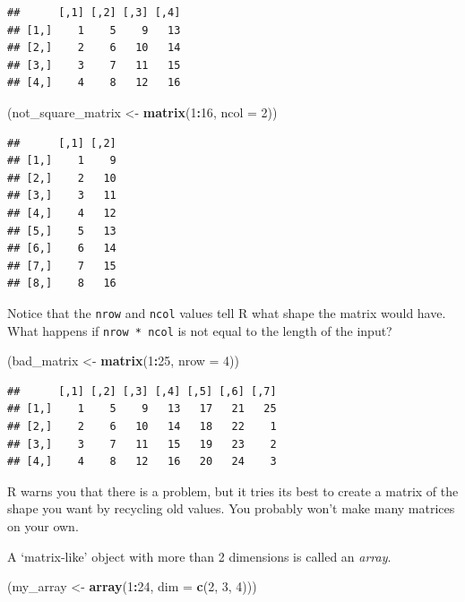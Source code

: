 \documentclass[]{article}
\newenvironment{Shaded}{\begin{snugshade}}{\end{snugshade}}
\newcommand{\KeywordTok}[1]{\textcolor[rgb]{0.13,0.29,0.53}{\textbf{#1}}}
\newcommand{\DataTypeTok}[1]{\textcolor[rgb]{0.13,0.29,0.53}{#1}}
\newcommand{\DecValTok}[1]{\textcolor[rgb]{0.00,0.00,0.81}{#1}}
\newcommand{\StringTok}[1]{\textcolor[rgb]{0.31,0.60,0.02}{#1}}
\newcommand{\OperatorTok}[1]{\textcolor[rgb]{0.81,0.36,0.00}{\textbf{#1}}}
\newcommand{\NormalTok}[1]{#1}
\begin{document}
\begin{verbatim}
##      [,1] [,2] [,3] [,4]
## [1,]    1    5    9   13
## [2,]    2    6   10   14
## [3,]    3    7   11   15
## [4,]    4    8   12   16
\end{verbatim}

\begin{Shaded}
\begin{Highlighting}[]
\NormalTok{(not_square_matrix <-}\StringTok{ }\KeywordTok{matrix}\NormalTok{(}\DecValTok{1}\OperatorTok{:}\DecValTok{16}\NormalTok{, }\DataTypeTok{ncol =} \DecValTok{2}\NormalTok{))}
\end{Highlighting}
\end{Shaded}

\begin{verbatim}
##      [,1] [,2]
## [1,]    1    9
## [2,]    2   10
## [3,]    3   11
## [4,]    4   12
## [5,]    5   13
## [6,]    6   14
## [7,]    7   15
## [8,]    8   16
\end{verbatim}

Notice that the \texttt{nrow} and \texttt{ncol} values tell R what shape
the matrix would have. What happens if \texttt{nrow\ *\ ncol} is not
equal to the length of the input?

\begin{Shaded}
\begin{Highlighting}[]
\NormalTok{(bad_matrix <-}\StringTok{ }\KeywordTok{matrix}\NormalTok{(}\DecValTok{1}\OperatorTok{:}\DecValTok{25}\NormalTok{, }\DataTypeTok{nrow =} \DecValTok{4}\NormalTok{))}
\end{Highlighting}
\end{Shaded}

\begin{verbatim}
##      [,1] [,2] [,3] [,4] [,5] [,6] [,7]
## [1,]    1    5    9   13   17   21   25
## [2,]    2    6   10   14   18   22    1
## [3,]    3    7   11   15   19   23    2
## [4,]    4    8   12   16   20   24    3
\end{verbatim}

R warns you that there is a problem, but it tries its best to create a
matrix of the shape you want by recycling old values. You probably won't
make many matrices on your own.

A `matrix-like' object with more than 2 dimensions is called an
\emph{array}.

\begin{Shaded}
\begin{Highlighting}[]
\NormalTok{(my_array <-}\StringTok{ }\KeywordTok{array}\NormalTok{(}\DecValTok{1}\OperatorTok{:}\DecValTok{24}\NormalTok{, }\DataTypeTok{dim =} \KeywordTok{c}\NormalTok{(}\DecValTok{2}\NormalTok{, }\DecValTok{3}\NormalTok{, }\DecValTok{4}\NormalTok{)))}
\end{Highlighting}
\end{Shaded}
\end{document}
